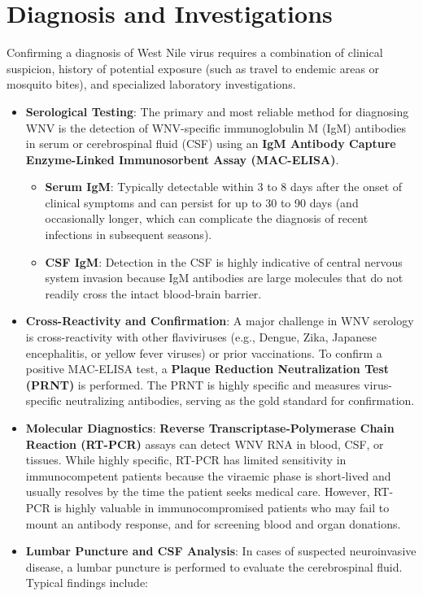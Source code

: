 \section*{Diagnosis and Investigations}
Confirming a diagnosis of West Nile virus requires a combination of clinical suspicion, history of potential exposure (such as travel to endemic areas or mosquito bites), and specialized laboratory investigations.
\begin{itemize}
    \item \textbf{Serological Testing}: The primary and most reliable method for diagnosing WNV is the detection of WNV-specific immunoglobulin M (IgM) antibodies in serum or cerebrospinal fluid (CSF) using an \textbf{IgM Antibody Capture Enzyme-Linked Immunosorbent Assay (MAC-ELISA)}.
    \begin{itemize}
        \item \textbf{Serum IgM}: Typically detectable within 3 to 8 days after the onset of clinical symptoms and can persist for up to 30 to 90 days (and occasionally longer, which can complicate the diagnosis of recent infections in subsequent seasons).
        \item \textbf{CSF IgM}: Detection in the CSF is highly indicative of central nervous system invasion because IgM antibodies are large molecules that do not readily cross the intact blood-brain barrier.
    \end{itemize}
    \item \textbf{Cross-Reactivity and Confirmation}: A major challenge in WNV serology is cross-reactivity with other flaviviruses (e.g., Dengue, Zika, Japanese encephalitis, or yellow fever viruses) or prior vaccinations. To confirm a positive MAC-ELISA test, a \textbf{Plaque Reduction Neutralization Test (PRNT)} is performed. The PRNT is highly specific and measures virus-specific neutralizing antibodies, serving as the gold standard for confirmation.
    \item \textbf{Molecular Diagnostics}: \textbf{Reverse Transcriptase-Polymerase Chain Reaction (RT-PCR)} assays can detect WNV RNA in blood, CSF, or tissues. While highly specific, RT-PCR has limited sensitivity in immunocompetent patients because the viraemic phase is short-lived and usually resolves by the time the patient seeks medical care. However, RT-PCR is highly valuable in immunocompromised patients who may fail to mount an antibody response, and for screening blood and organ donations.
    \item \textbf{Lumbar Puncture and CSF Analysis}: In cases of suspected neuroinvasive disease, a lumbar puncture is performed to evaluate the cerebrospinal fluid. Typical findings include:

\end{itemize}
